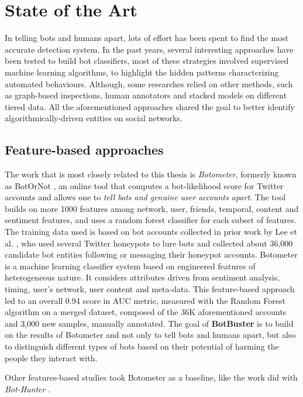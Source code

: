 \chapter{State of the Art}
\label{capitolo2}
\thispagestyle{empty}

In telling bots and humans apart, lots of effort has been spent to find the most accurate detection system. In the past years, several interesting approaches have been tested to build bot classifiers, most of these strategies involved supervised machine learning algorithms, to highlight the hidden patterns characterizing automated behaviours. Although, some researches relied on other methods, such as graph-based inspections, human annotators and stacked models on different tiered data. All the aforementioned approaches shared the goal to better identify algorithmically-driven entities on social networks.

\section{Feature-based approaches}
The work that is most closely related to this thesis is\textit{ Botometer}, formerly known as BotOrNot \cite{Botometer, BotorNot}, an online tool that computes a bot-likelihood score for Twitter accounts and allows one to \emph{tell bots and genuine user accounts apart}. The tool builds on more 1000 features among network, user, friends, temporal, content and sentiment features, and uses a random forest classifier for each subset of features. The training data used is based on bot accounts collected in prior work by Lee et al. \cite{lee2011seven}, who used several Twitter honeypots to lure bots and collected about 36,000 candidate bot entities following or messaging their honeypot accounts. 
Botometer is a machine learning classifier system based on engineered features of heterogeneous nature. It considers attributes driven from sentiment analysis, timing, user's network, user content and meta-data. This feature-based approach led to an overall 0.94 score in AUC metric, measured with the Random Forest algorithm on a merged dataset, composed of the 36K aforementioned accounts and 3,000 new samples, manually annotated.
The goal of \textbf{BotBuster} is to build on the results of Botometer and not only to tell bots and humans apart, but also to distinguish different types of bots based on their potential of harming the people they interact with.

Other features-based studies took Botometer as a baseline, like the work did with \textit{Bot-Hunter} \cite{Bot-Hunter}.

